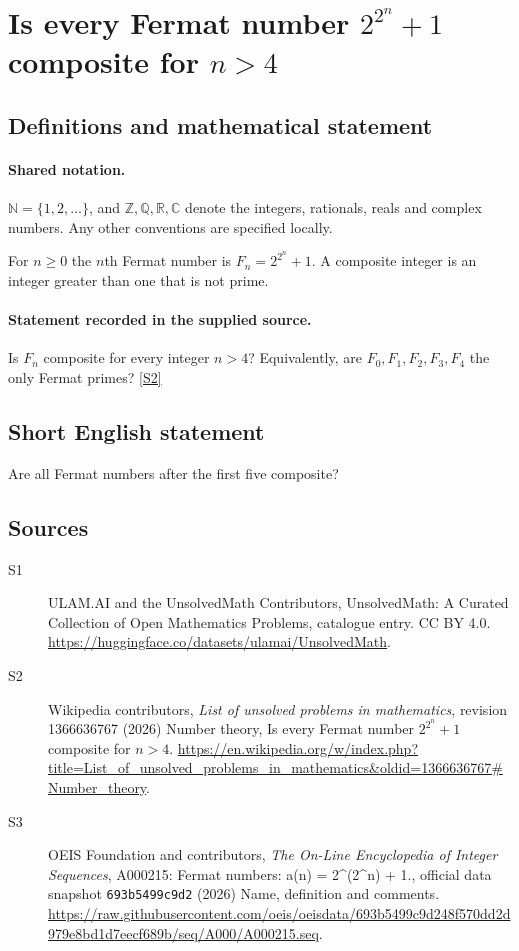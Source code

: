 \documentclass[11pt]{article}
\newcommand{\sref}[2]{\hyperlink{source:#1:#2}{[S#2]}}
\begin{document}
\section{Is every Fermat number $2^{2^n} + 1$ composite for $n > 4$}\label{statement}

\subsection{Definitions and mathematical statement}

\paragraph{Shared notation.}$\mathbb N=\{1,2,\ldots\}$, and $\mathbb Z,\mathbb Q,\mathbb R,\mathbb C$ denote the integers, rationals, reals and complex numbers. Any other conventions are specified locally.


For $n\ge0$ the $n$th Fermat number is $F_n=2^{2^n}+1$. A composite integer is an integer greater than one that is not prime.
\paragraph{Statement recorded in the supplied source.}
Is $F_n$ composite for every integer $n>4$? Equivalently, are $F_0,F_1,F_2,F_3,F_4$ the only Fermat primes? \sref{statement}{2}
\subsection{Short English statement}
Are all Fermat numbers after the first five composite?
\subsection{Sources}
\begin{description}
\item[\hypertarget{source:statement:1}{S1}] ULAM.AI and the UnsolvedMath Contributors, UnsolvedMath: A Curated Collection of Open Mathematics Problems, catalogue entry. CC BY 4.0. \url{https://huggingface.co/datasets/ulamai/UnsolvedMath}.
\item[\hypertarget{source:statement:2}{S2}] Wikipedia contributors, \emph{List of unsolved problems in mathematics}, revision 1366636767 (2026) Number theory, Is every Fermat number $2^{2^n} + 1$ composite for $n > 4$. \url{https://en.wikipedia.org/w/index.php?title=List_of_unsolved_problems_in_mathematics&oldid=1366636767#Number_theory}.
\item[\hypertarget{source:statement:3}{S3}] OEIS Foundation and contributors, \emph{The On-Line Encyclopedia of Integer Sequences}, A000215: Fermat numbers: a(n) = 2\textasciicircum{}(2\textasciicircum{}n) + 1., official data snapshot \texttt{693b5499c9d2} (2026) Name, definition and comments. \url{https://raw.githubusercontent.com/oeis/oeisdata/693b5499c9d248f570dd2d979e8bd1d7eecf689b/seq/A000/A000215.seq}.
\end{description}
\label{end:statement}
\end{document}
